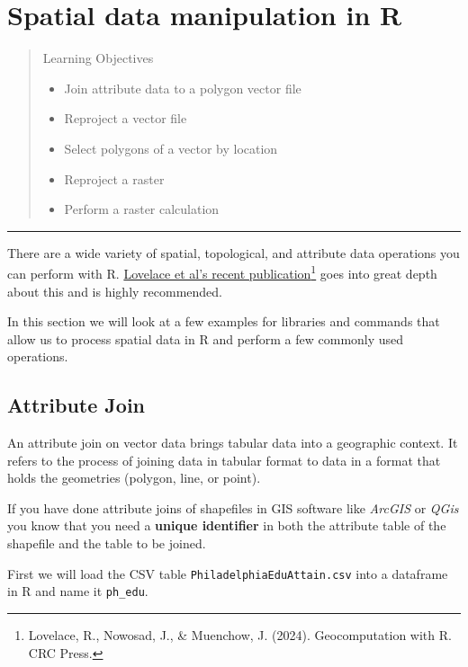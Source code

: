\documentclass[
]{book}
\providecommand{\tightlist}{%
  \setlength{\itemsep}{0pt}\setlength{\parskip}{0pt}}
\begin{document}
\hypertarget{spatialops}{%
\chapter{Spatial data manipulation in R}\label{spatialops}}

\begin{quote}
Learning Objectives

\begin{itemize}
\tightlist
\item
  Join attribute data to a polygon vector file
\item
  Reproject a vector file
\item
  Select polygons of a vector by location
\item
  Reproject a raster
\item
  Perform a raster calculation
\end{itemize}
\end{quote}

\begin{center}\rule{0.5\linewidth}{0.5pt}\end{center}

There are a wide variety of spatial, topological, and attribute data operations you can perform with R. \href{https://r.geocompx.org/}{Lovelace et al's recent publication}\footnote{Lovelace, R., Nowosad, J., \& Muenchow, J. (2024). Geocomputation with R. CRC Press.} goes into great depth about this and is highly recommended.

In this section we will look at a few examples for libraries and commands that allow us to process spatial data in R and perform a few commonly used operations.

\hypertarget{attribute-join}{%
\section{Attribute Join}\label{attribute-join}}

An attribute join on vector data brings tabular data into a geographic context. It refers to the process of joining data in tabular format to data in a format that holds the geometries (polygon, line, or point).

If you have done attribute joins of shapefiles in GIS software like \emph{ArcGIS} or \emph{QGis} you know that you need a \textbf{unique identifier} in both the attribute table of the shapefile and the table to be joined.

First we will load the CSV table \texttt{PhiladelphiaEduAttain.csv} into a dataframe in R and name it \texttt{ph\_edu}.
\end{document}
